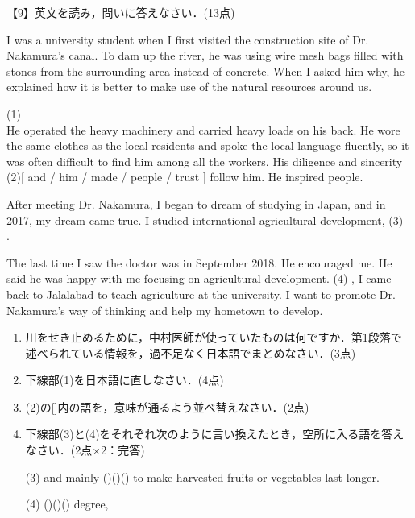 \newpage
\noindent 【9】英文を読み，問いに答えなさい．(13点)\par\qquad
I was a university student when I first visited the construction site of Dr. Nakamura's canal. To dam up the river, he was using wire mesh bags filled with stones from the surrounding area instead of concrete.
When I asked him why, he explained how it is better to make use of the natural resources around us.\par\qquad
(1)  \\
He operated the heavy machinery and carried heavy loads on his back.
He wore the same clothes as the local residents and spoke the local language fluently, so it was often difficult to find him among all the workers.
His diligence and sincerity (2)[ and / him / made / people / trust ] follow him. 
He inspired people.\par\qquad
After meeting Dr. Nakamura, I began to dream of studying in Japan, and in 2017, my dream came true.
I studied international agricultural development, (3) \\.\par\qquad
The last time I saw the doctor was in September 2018.
He encouraged me.
He said he was happy with me focusing on agricultural development.
(4) , I came back to Jalalabad to teach agriculture at the university.
I want to promote Dr. Nakamura's way of thinking and help my hometown to develop.
\bigskip
\begin{enumerate}
  \item 川をせき止めるために，中村医師が使っていたものは何ですか．第1段落で述べられている情報を，過不足なく日本語でまとめなさい．(3点)\vspace{1.8cm}
  \item 下線部(1)を日本語に直しなさい．(4点)\vspace{1.8cm}
  \item (2)の[\qquad]内の語を，意味が通るよう並べ替えなさい．(2点)\vspace{1.8cm}
  \item 下線部(3)と(4)をそれぞれ次のように言い換えたとき，空所に入る語を答えなさい．(2点$\times$2：完答)
  \par (3) and mainly (\qquad)(\qquad)(\qquad) to make harvested fruits or vegetables last longer.
  \par (4) (\qquad)(\qquad)(\qquad) degree,
\end{enumerate}

